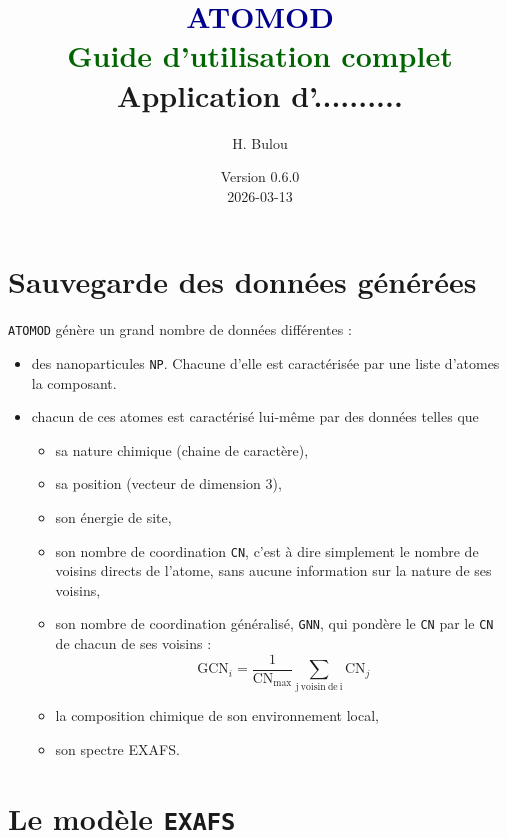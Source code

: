 \documentclass[12pt,a4paper,french]{book}
\title{\Huge\textbf{\textcolor{darkblue}{ATOMOD}}\\
       \Large\textcolor{darkgreen}{Guide d'utilisation complet}\\
       \normalsize Application d'..........}
\author{H. Bulou}
\date{Version 0.6.0 \\ 2026-03-13}
\begin{document}
\maketitle
\newpage
\thispagestyle{empty}
\mbox{}

\newpage
\tableofcontents
\newpage


\cprotect\chapter{Sauvegarde des données générées}
\verb+ATOMOD+ génère un grand nombre de données différentes :
\begin{itemize}
	\item des nanoparticules \verb+NP+. Chacune d'elle est caractérisée par une liste d'atomes la composant. 
	\item chacun de ces atomes est caractérisé lui-même par des données telles que
	\begin{itemize}
		\item sa nature chimique (chaine de caractère),
		\item sa position (vecteur de dimension 3),
		\item son énergie de site,
		\item son nombre de coordination \verb+CN+, c'est à dire simplement le nombre de voisins directs de l'atome, sans aucune information sur la nature de ses voisins,
		\item son nombre de coordination généralisé, \verb+GNN+, qui pondère le \verb+CN+  par le \verb+CN+ de chacun de ses voisins :
		$$\mathrm{GCN}_i = \frac{1}{\mathrm{CN}_\mathrm{max}}  \sum_\mathrm{j\ voisin\ de\ i} \mathrm{CN}_j$$
		\item la composition chimique de son environnement local,
		\item son spectre EXAFS.
	\end{itemize}
\end{itemize}

\cprotect\chapter{Le modèle \verb+EXAFS+}
\end{document}
